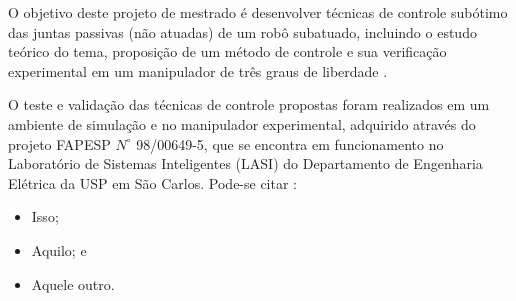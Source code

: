 O objetivo deste projeto de mestrado é desenvolver técnicas de controle subótimo das juntas passivas (não atuadas) de um robô subatuado, incluindo o estudo teórico do tema, proposição de um método de controle e sua verificação
experimental em um manipulador de três graus de liberdade \cite{Nascimento1970}.

O teste \cite{Patagonios2001} e validação das técnicas de controle propostas foram realizados em um ambiente de simulação e no manipulador
experimental, adquirido através do projeto FAPESP $N^{\circ}$ 98/00649-5, que se encontra em funcionamento no Laboratório de Sistemas Inteligentes (LASI) do Departamento de Engenharia Elétrica da USP em São Carlos. Pode-se citar \cite{Furmento1995}:
\begin{itemize}
\item Isso;
\item Aquilo; e
\item Aquele outro.
\end{itemize}